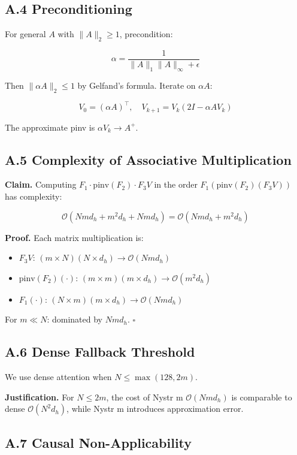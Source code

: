 \subsection{A.4 Preconditioning}

For general $A$ with $\|A\|_2 \geq 1$, precondition:

\[
\alpha = \frac{1}{\|A\|_1 \|A\|_\infty + \epsilon}
\tag{A.5}
\]

Then $\|\alpha A\|_2 \leq 1$ by Gelfand's formula. Iterate on $\alpha A$:

\[
V_0 = (\alpha A)^\top, \quad V_{k+1} = V_k (2I - \alpha A V_k)
\tag{A.6}
\]

The approximate pinv is $\alpha V_k \to A^+$.

\subsection{A.5 Complexity of Associative Multiplication}

\textbf{Claim.} Computing $F_1 \cdot \text{pinv}(F_2) \cdot F_3 V$ in the order 
$F_1 (\text{pinv}(F_2) (F_3 V))$ has complexity:

\[
\mathcal{O}(N m d_h + m^2 d_h + N m d_h) = \mathcal{O}(N m d_h + m^2 d_h)
\tag{A.7}
\]

\textbf{Proof.} Each matrix multiplication is:
\begin{itemize}
\item $F_3 V$: $(m \times N) (N \times d_h) \to \mathcal{O}(N m d_h)$
\item $\text{pinv}(F_2) (\cdot)$: $(m \times m) (m \times d_h) \to \mathcal{O}(m^2 d_h)$
\item $F_1 (\cdot)$: $(N \times m) (m \times d_h) \to \mathcal{O}(N m d_h)$

\end{itemize}
For $m \ll N$: dominated by $N m d_h$. $\square$

\subsection{A.6 Dense Fallback Threshold}

We use dense attention when $N \leq \max(128, 2m)$.

\textbf{Justification.} For $N \leq 2m$, the cost of Nystr m $\mathcal{O}(N m d_h)$ 
is comparable to dense $\mathcal{O}(N^2 d_h)$, while Nystr m introduces 
approximation error.

\subsection{A.7 Causal Non-Applicability}

